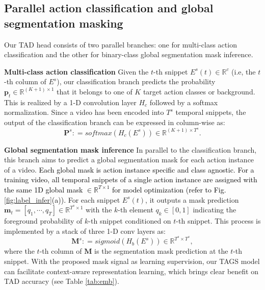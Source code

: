 \documentclass[runningheads]{llncs}
\newcommand{\shortmodelname}{TAGS}
\begin{document}
\subsection{Parallel action classification and global segmentation masking}
\label{sec:model_head}
Our TAD head consists of two parallel branches:
one for multi-class action classification 
and 
the other for binary-class global segmentation mask inference. 

 
\noindent\textbf{Multi-class action classification}
Given the $t$-th snippet $E^{s}(t) \in \mathbb{R}^{c}$ (i.e, the $t$-th column of $E^{s}$),
our classification branch predicts the probability $\bm{p}_t \in \mathbb{R}^{(K+1)\times 1}$ that
it belongs to one of $K$ target action classes or background.
This is realized by a 1-D convolution layer $H_c$ followed by 
a softmax normalization.
Since a video has been encoded into $T^{s}$ temporal snippets, the output of the classification branch can be expressed in column-wise as:
\begin{equation}\label{eqn_3}
\bm{P}^{s} : = softmax(H_c(E^{s})) \in \mathbb{R}^{(K+1) \times T^{s}}.
\end{equation}


\noindent\textbf{Global segmentation mask inference} 
In parallel to the classification branch,
this branch aims to predict a global segmentation mask for each action instance of a video.
\textcolor{black}{
Each global mask is action instance specific and class agnostic.
For a training video, all temporal snippets of a single action instance are assigned with the same 1D global mask $\in \mathbb{R}^{T \times 1}$ for model optimization \textcolor{black} {(refer to Fig. \ref{fig:label_infer}(a)).}
}
For each snippet $E^{s}(t)$, 
it outputs a mask prediction $\bm{m}_t = [q_{1}, \cdots, q_{T}] \in \mathbb{R}^{T^{s} \times 1}$
with the $k$-th element $q_{k} \in [0, 1]$ indicating the foreground probability of $k$-th snippet conditioned on 
$t$-th snippet.
This process is implemented by a stack of three 1-D conv layers as:
\begin{equation}\label{eqn_4}
\bm{M}^{s} : = sigmoid(H_b(E^{s})) \in \mathbb{R}^{ T^{s} \times T^{s}}, 
\end{equation}
where the $t$-th column of $\bm{M}$ is the segmentation mask prediction at the $t$-th snippet.
With the proposed mask signal as learning supervision,
our {\shortmodelname} model can facilitate context-aware representation learning, which brings clear benefit on TAD accuracy (see Table \ref{tab:emb}).
\end{document}

